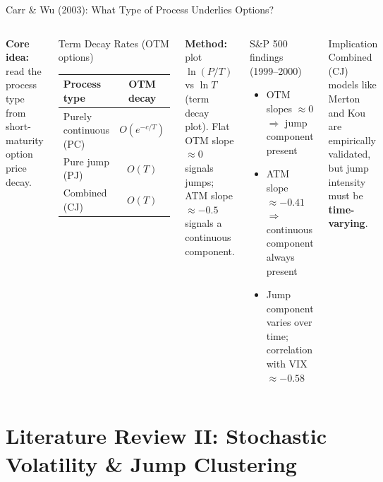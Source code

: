 \documentclass[aspectratio=169,10pt]{beamer}
\begin{document}
\begin{frame}{Carr \& Wu (2003): What Type of Process Underlies Options?}
\begin{columns}[T]
{\small\textbf{Core idea:} read the process type from short-maturity option price decay.}

\smallskip
\begin{block}{Term Decay Rates (OTM options)}
\footnotesize
\begin{tabular}{lc}
\toprule
Process type & OTM decay \\
\midrule
Purely continuous (PC) & $O(e^{-c/T})$ \\
Pure jump (PJ)         & $O(T)$ \\
Combined (CJ)          & $O(T)$ \\
\bottomrule
\end{tabular}
\end{block}

\smallskip
{\footnotesize\textbf{Method:} plot $\ln(P/T)$ vs $\ln T$ (term decay plot). Flat OTM slope $\approx 0$ signals jumps; ATM slope $\approx{-0.5}$ signals a continuous component.}

\begin{block}{S\&P 500 findings (1999--2000)}
\footnotesize
\begin{itemize}\itemsep1pt
  \item OTM slopes $\approx 0$ $\Rightarrow$ jump component present
  \item ATM slope $\approx -0.41$ $\Rightarrow$ continuous component always present
  \item Jump component varies over time; correlation with VIX $\approx -0.58$
\end{itemize}
\end{block}

\begin{alertblock}{Implication}
\footnotesize Combined (CJ) models like Merton and Kou are empirically validated, but jump intensity must be \textbf{time-varying}.
\end{alertblock}
\end{columns}
\end{frame}

\section{Literature Review II: Stochastic Volatility \& Jump Clustering}
\end{document}

